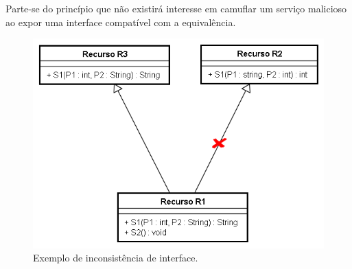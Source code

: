 	Parte-se do princípio que não existirá interesse em camuflar um serviço malicioso ao expor uma interface compatível com a equivalência.

\begin{figure}[ht]
	\center
	\includegraphics[scale=0.8]{imagens/consistenciaInterface}
	\caption{Exemplo de inconsistência de interface.}
	\label{fig:consistenciaInterface}
\end{figure}

